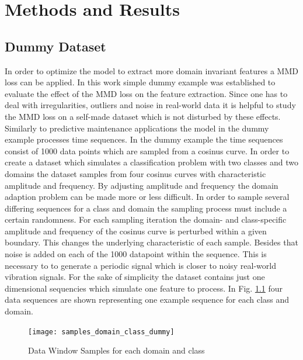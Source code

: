 
\chapter{Methods and Results}\label{chapter:introduction}

\section{Dummy Dataset}
In order to optimize the model to extract more domain invariant features a MMD loss can be applied. In this work simple dummy example was established to evaluate the effect of the MMD loss on the feature extraction. Since one has to deal with irregularities, outliers and noise in real-world data it is helpful to study the MMD loss on a self-made dataset which is not disturbed by these effects. Similarly to predictive maintenance applications the model in the dummy example processes time sequences. In the dummy example the time sequences consist of 1000 data points which are sampled from a cosinus curve. In order to create a dataset which simulates a classification problem with two classes and two domains the dataset samples from four cosinus curves with characteristic amplitude and frequency. By adjusting amplitude and frequency the domain adaption problem can be made more or less difficult. In order to sample several differing sequences for a class and domain the sampling process must include a certain randomness. For each sampling iteration the domain- and class-specific amplitude and frequency of the cosinus curve is perturbed within a given boundary. This changes the underlying characteristic of each sample. Besides that noise is added on each of the 1000 datapoint within the sequence. This is necessary to to generate a periodic signal which is closer to noisy real-world vibration signals. For the sake of simplicity the dataset contains just one dimensional sequencies which simulate one feature to process. In Fig. \ref{fig:samples_domain_class_dummy} four data sequences are shown representing one example sequence for each class and domain. 

\begin{figure}[htpb]
  \centering
  \texttt{[image: samples\_domain\_class\_dummy]}
  \caption {Data Window Samples for each domain and class}
  \label{fig:samples_domain_class_dummy}
\end{figure}

